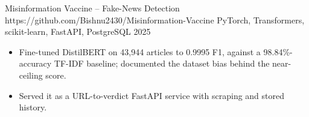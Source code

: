 \entrygap

\resumeproject
{Misinformation Vaccine -- Fake-News Detection}
{https://github.com/Bishnu2430/Misinformation-Vaccine}
{PyTorch, Transformers, scikit-learn, FastAPI, PostgreSQL}
{2025}
\begin{itemize}
\item Fine-tuned DistilBERT on 43,944 articles to 0.9995 F1, against a 98.84\%-accuracy TF-IDF baseline; documented the dataset bias behind the near-ceiling score.
\item Served it as a URL-to-verdict FastAPI service with scraping and stored history.
\end{itemize}
